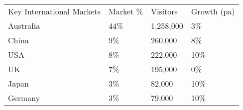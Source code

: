 \begin{tabular}[t]{p{3.5cm}p{1.1cm}p{1.3cm}p{1.2cm}}
 Key International Markets & Market \% & Visitors & Growth (pa) \\ 
 Australia & 44\% & 1,258,000 & 3\% \\ 
  China & 9\% &   260,000 & 8\% \\ 
  USA & 8\% &   222,000 & 10\% \\ 
  UK & 7\% &   195,000 & 0\% \\ 
  Japan & 3\% &    82,000 & 10\% \\ 
  Germany & 3\% &    79,000 & 10\% \\ 
  \end{tabular}
